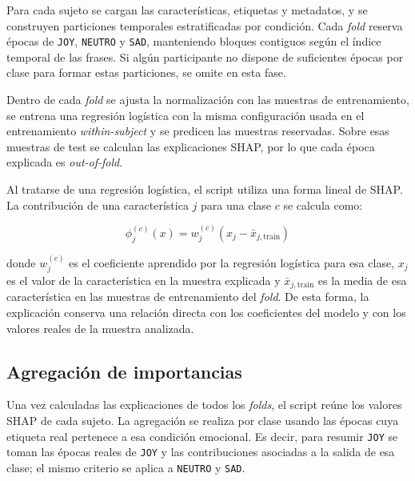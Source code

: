 Para cada sujeto se cargan las características, etiquetas y metadatos, y se construyen particiones temporales estratificadas por condición. Cada \textit{fold} reserva épocas de \texttt{JOY}, \texttt{NEUTRO} y \texttt{SAD}, manteniendo bloques contiguos según el índice temporal de las frases. Si algún participante no dispone de suficientes épocas por clase para formar estas particiones, se omite en esta fase.

Dentro de cada \textit{fold} se ajusta la normalización con las muestras de entrenamiento, se entrena una regresión logística con la misma configuración usada en el entrenamiento \textit{within-subject} y se predicen las muestras reservadas. Sobre esas muestras de test se calculan las explicaciones \ac{SHAP}, por lo que cada época explicada es \textit{out-of-fold}.

Al tratarse de una regresión logística, el script utiliza una forma lineal de \ac{SHAP}. La contribución de una característica \(j\) para una clase \(c\) se calcula como:

\begin{myequation}[H]
\[
\phi_j^{(c)}(x) = w_j^{(c)} \left(x_j - \bar{x}_{j,\mathrm{train}}\right)
\]
\caption{Contribución \acs{SHAP} lineal utilizada para la regresión logística en cada \textit{fold}.}
\label{eq:shap_lineal}
\end{myequation}

donde \(w_j^{(c)}\) es el coeficiente aprendido por la regresión logística para esa clase, \(x_j\) es el valor de la característica en la muestra explicada y \(\bar{x}_{j,\mathrm{train}}\) es la media de esa característica en las muestras de entrenamiento del \textit{fold}. De esta forma, la explicación conserva una relación directa con los coeficientes del modelo y con los valores reales de la muestra analizada.

\subsection{Agregación de importancias}

Una vez calculadas las explicaciones de todos los \textit{folds}, el script reúne los valores \ac{SHAP} de cada sujeto. La agregación se realiza por clase usando las épocas cuya etiqueta real pertenece a esa condición emocional. Es decir, para resumir \texttt{JOY} se toman las épocas reales de \texttt{JOY} y las contribuciones asociadas a la salida de esa clase; el mismo criterio se aplica a \texttt{NEUTRO} y \texttt{SAD}.

